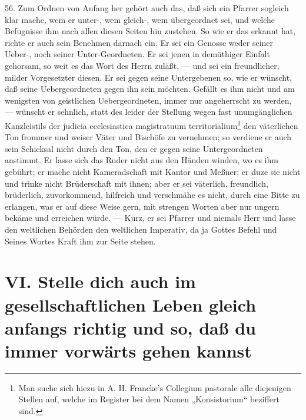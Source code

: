 56. Zum Ordnen von Anfang her gehört auch das, daß sich ein Pfarrer sogleich klar mache, wem er unter-, wem gleich-, wem übergeordnet sei, und welche Befugnisse ihm nach allen diesen Seiten hin zustehen. So wie
er das erkannt hat, richte er auch sein Benehmen darnach ein. Er sei ein Genosse weder seiner Ueber-, noch seiner Unter-Geordneten. Er sei jenen in demüthiger Einfalt gehorsam, so weit es das Wort des Herrn zuläßt, — und sei ein freundlicher, milder Vorgesetzter diesen. Er sei gegen seine Untergebenen so, wie er wünscht, daß seine Uebergeordneten gegen ihn sein möchten. Gefällt es ihm nicht und am wenigsten von geistlichen Uebergeordneten, immer nur angeherrscht zu werden, — wünscht er sehnlich, statt des leider der Stellung wegen fast unumgänglichen Kanzleistils der judicia ecclesiastica magistratuum territorialium\footnote{Man suche sich hiezu in A. H. Francke’s Collegium pastorale alle diejenigen Stellen auf, welche im Register bei dem Namen „Konsistorium“ beziffert sind.} den väterlichen Ton frommer und weiser Väter und Bischöfe zu vernehmen; so verdiene er auch sein Schicksal nicht durch den Ton, den er gegen seine Untergeordneten anstimmt. Er lasse sich das Ruder nicht aus den Händen winden, wo es ihm gebührt; er mache nicht Kameradschaft mit Kantor und Meßner; er duze sie nicht und trinke nicht Brüderschaft mit ihnen; aber er sei väterlich, freundlich, brüderlich, zuvorkommend, hilfreich und verschmähe es nicht, durch eine Bitte zu erlangen, was er auf diese Weise gern, mit strengen Worten aber nur ungern bekäme und erreichen würde. — Kurz, er sei Pfarrer und niemals Herr und lasse den weltlichen Behörden den weltlichen Imperativ, da ja Gottes Befehl und Seines Wortes Kraft ihm zur Seite stehen.

\section[VI. Stelle dich im gesellschaftlichen Leben richtig]{VI. Stelle dich auch im gesellschaftlichen Leben gleich anfangs richtig und so, daß du immer vorwärts gehen kannst}

